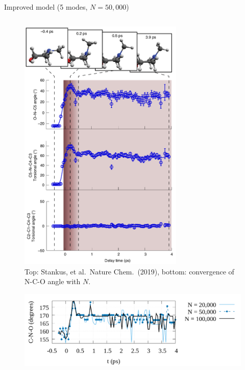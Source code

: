 \documentclass{beamer}
\begin{document}
\begin{frame}{Improved model (5 modes, $N=50{,}000$)}
\begin{columns}
		\begin{column}{0.5\textwidth}
			\vspace{-10mm}
			\begin{figure}[H]
				\centering
				\includegraphics[width=0.7\textwidth]{stankus_angle_plots.png}
				\caption{{\tiny Top: Stankus, et al.\ Nature Chem.\ (2019), bottom: convergence of N-C-O angle with $N$.}}
				\label{fig:nmm-geom}
			\end{figure}
		\vspace{-38mm}
			\begin{figure}[H]
			\centering
			\includegraphics[width=\textwidth]{figures/argmin_angle_5modes_convergence.png}
			\text{}
		\end{figure}
		\end{column}
	\end{columns}
\end{frame}
\end{document}
